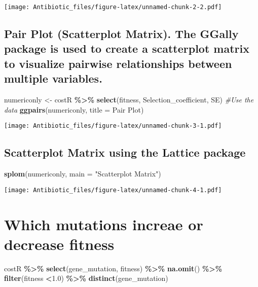 \documentclass[
]{article}
\newenvironment{Shaded}{\begin{snugshade}}{\end{snugshade}}
\newcommand{\AttributeTok}[1]{\textcolor[rgb]{0.13,0.29,0.53}{#1}}
\newcommand{\CommentTok}[1]{\textcolor[rgb]{0.56,0.35,0.01}{\textit{#1}}}
\newcommand{\FloatTok}[1]{\textcolor[rgb]{0.00,0.00,0.81}{#1}}
\newcommand{\FunctionTok}[1]{\textcolor[rgb]{0.13,0.29,0.53}{\textbf{#1}}}
\newcommand{\NormalTok}[1]{#1}
\newcommand{\OtherTok}[1]{\textcolor[rgb]{0.56,0.35,0.01}{#1}}
\newcommand{\SpecialCharTok}[1]{\textcolor[rgb]{0.81,0.36,0.00}{\textbf{#1}}}
\newcommand{\StringTok}[1]{\textcolor[rgb]{0.31,0.60,0.02}{#1}}
\begin{document}
\texttt{[image: Antibiotic\_files/figure-latex/unnamed-chunk-2-2.pdf]}

\subsection{Pair Plot (Scatterplot Matrix). The GGally package is used
to create a scatterplot matrix to visualize pairwise relationships
between multiple
variables.}\label{pair-plot-scatterplot-matrix.-the-ggally-package-is-used-to-create-a-scatterplot-matrix-to-visualize-pairwise-relationships-between-multiple-variables.}

\begin{Shaded}
\begin{Highlighting}[]
\NormalTok{numericonly }\OtherTok{\textless{}{-}}\NormalTok{ costR }\SpecialCharTok{\%\textgreater{}\%} 
  \FunctionTok{select}\NormalTok{(fitness, Selection\_coefficient, SE)}
\CommentTok{\#Use the data}
\FunctionTok{ggpairs}\NormalTok{(numericonly, }\AttributeTok{title =} \StringTok{\textquotesingle{}Pair Plot\textquotesingle{}}\NormalTok{)}
\end{Highlighting}
\end{Shaded}

\texttt{[image: Antibiotic\_files/figure-latex/unnamed-chunk-3-1.pdf]}

\subsection{Scatterplot Matrix using the Lattice
package}\label{scatterplot-matrix-using-the-lattice-package}

\begin{Shaded}
\begin{Highlighting}[]
\FunctionTok{splom}\NormalTok{(numericonly,}
      \AttributeTok{main =} \StringTok{"Scatterplot Matrix"}\NormalTok{)}
\end{Highlighting}
\end{Shaded}

\texttt{[image: Antibiotic\_files/figure-latex/unnamed-chunk-4-1.pdf]}

\section{Which mutations increae or decrease
fitness}\label{which-mutations-increae-or-decrease-fitness}

\begin{Shaded}
\begin{Highlighting}[]
\NormalTok{  costR }\SpecialCharTok{\%\textgreater{}\%} 
    \FunctionTok{select}\NormalTok{(gene\_mutation, fitness) }\SpecialCharTok{\%\textgreater{}\%} 
    \FunctionTok{na.omit}\NormalTok{() }\SpecialCharTok{\%\textgreater{}\%} 
    \FunctionTok{filter}\NormalTok{(fitness }\SpecialCharTok{\textless{}}\FloatTok{1.0}\NormalTok{) }\SpecialCharTok{\%\textgreater{}\%} 
    \FunctionTok{distinct}\NormalTok{(gene\_mutation)}
\end{Highlighting}
\end{Shaded}
\end{document}
